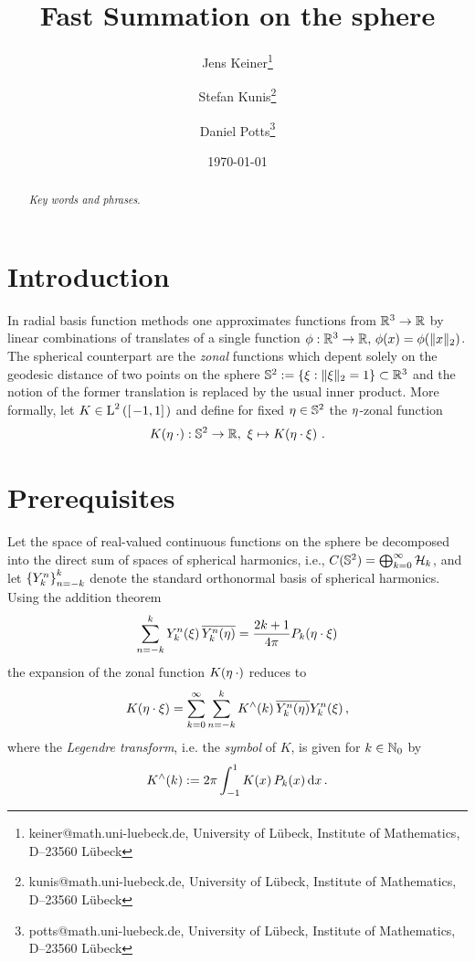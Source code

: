 \documentclass[11pt,a4paper,twoside,bibtotoc]{scrartcl}
\title{
Fast Summation on the sphere}
\date{\today}
\author{
Jens Keiner\thanks{keiner@math.uni-luebeck.de, University of
  L\"ubeck, Institute of Mathematics, D--23560 L\"ubeck} \and
Stefan Kunis\thanks{kunis@math.uni-luebeck.de, University of
  L\"ubeck, Institute of Mathematics, D--23560 L\"ubeck} \and
  Daniel Potts\thanks{potts@math.uni-luebeck.de, University of
  L\"ubeck, Institute of Mathematics, D--23560 L\"ubeck} 
}
\theoremstyle{plain}
\theoremstyle{definition}
\theoremstyle{remark}
\numberwithin{equation}{section}
\numberwithin{table}{section}
\numberwithin{figure}{section}
\begin{document}
\maketitle

\begin{abstract}
\medskip


\noindent
{\it Key words and phrases}.  
\end{abstract}

\section{Introduction}
\label{sect:1}
In radial basis function methods one approximates functions from $\mathbb{R}^3
\rightarrow \mathbb{R}$ by linear combinations of translates of a single function
$\phi:\mathbb{R}^3 \rightarrow \mathbb{R}, \, \phi(x)=\phi(\|x\|_2)$.
The spherical counterpart are the \emph{zonal} functions which depent solely
on the geodesic distance of two points on the sphere $\mathbb{S}^2:=\{
\mathbf{\xi}: \|\mathbf{\xi}\|_2=1\} \subset \mathbb{R}^3$ and the notion of the former
translation is replaced by the usual inner product.
More formally, let $K \in \text{\rm{L}}^{2}\left(\left[\left.-1,1\right]\right.\right)$ and define for fixed
$\mathbf{\eta} \in \mathbb{S}^2$ the $\mathbf{\eta}$-zonal function 
\[
  \fun{K}{\V{\eta} \: \cdot}: \twosphere \rightarrow \R,\ \V{\xi} \mapsto
  \fun{K}{\V{\eta} \cdot \V{\xi}}\,.%
\]

\section{Prerequisites}
\label{sect:2}
Let the space of real-valued continuous functions on the sphere be decomposed
into the direct sum of spaces of spherical harmonics, i.e.,
$C(\mathbb{S}^2)=\bigoplus_{k=0}^{\infty} \mathcal{H}_k$, and let
$\left\{Y_{k}^n\right\rbrace_{n=-k}^{k}$ denote the standard orthonormal basis of spherical
harmonics.
Using the addition theorem
\[
\sum_{n=-k}^{k} Y_{k}^n{\hspace{-0.4ex}}\left(\mathbf{\xi}\right) \overline{Y_{k}^n{\hspace{-0.4ex}}\left(\mathbf{\eta}\right)} =
    \frac{2k+1}{4\pi}P_k{\hspace{-0.4ex}}\left(\mathbf{\eta} \cdot \mathbf{\xi}\right)
\]
the expansion of the zonal function $K{\hspace{-0.4ex}}\left(\mathbf{\eta} \: \cdot\right)$ reduces to
\begin{equation}
  \label{Basics:Kernel}
  K{\hspace{-0.4ex}}\left(\mathbf{\eta} \cdot \mathbf{\xi}\right) = \sum_{k = 0}^{\infty} \sum_{n=-k}^k
  K^{\wedge}{\hspace{-0.4ex}}\left(k\right)\overline{Y_{k}^n{\hspace{-0.4ex}}\left(\mathbf{\eta}\right)} Y_{k}^n{\hspace{-0.4ex}}\left(\mathbf{\xi}\right),
\end{equation}
where the \emph{Legendre transform}, i.e. the \emph{symbol} of $K$, is given
for $k \in \mathbb{N}_{0}$ by
\[
  K^{\wedge}{\hspace{-0.4ex}}\left(k\right) := 2 \pi \int_{-1}^{1} K{\hspace{-0.4ex}}\left(x\right) P_{k}{\hspace{-0.4ex}}\left(x\right) \text{\rm{d}} x\,.
\]
\end{document}
